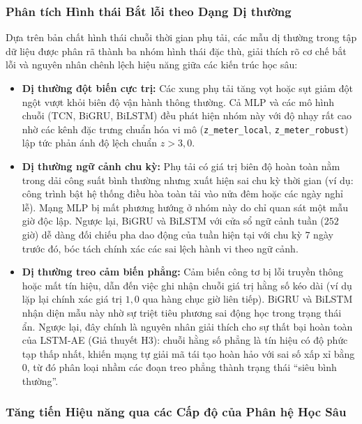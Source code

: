\subsubsection{Phân tích Hình thái Bắt lỗi theo Dạng Dị thường}

Dựa trên bản chất hình thái chuỗi thời gian phụ tải, các mẫu dị thường trong tập dữ liệu được phân rã thành ba nhóm hình thái đặc thù, giải thích rõ cơ chế bắt lỗi và nguyên nhân chênh lệch hiệu năng giữa các kiến trúc học sâu:
\begin{itemize}
    \item \textbf{Dị thường đột biến cực trị:} Các xung phụ tải tăng vọt hoặc sụt giảm đột ngột vượt khỏi biên độ vận hành thông thường. Cả MLP và các mô hình chuỗi (TCN, BiGRU, BiLSTM) đều phát hiện nhóm này với độ nhạy rất cao nhờ các kênh đặc trưng chuẩn hóa vi mô (\texttt{z\_meter\_local}, \texttt{z\_meter\_robust}) lập tức phản ánh độ lệch chuẩn $z > 3{,}0$.
    \item \textbf{Dị thường ngữ cảnh chu kỳ:} Phụ tải có giá trị biên độ hoàn toàn nằm trong dải công suất bình thường nhưng xuất hiện sai chu kỳ thời gian (ví dụ: công trình bật hệ thống điều hòa toàn tải vào nửa đêm hoặc các ngày nghỉ lễ). Mạng MLP bị mất phương hướng ở nhóm này do chỉ quan sát một mẫu giờ độc lập. Ngược lại, BiGRU và BiLSTM với cửa sổ ngữ cảnh tuần ($252$ giờ) dễ dàng đối chiếu pha dao động của tuần hiện tại với chu kỳ 7 ngày trước đó, bóc tách chính xác các sai lệch hành vi theo ngữ cảnh.
    \item \textbf{Dị thường treo cảm biến phẳng:} Cảm biến công tơ bị lỗi truyền thông hoặc mất tín hiệu, dẫn đến việc ghi nhận chuỗi giá trị hằng số kéo dài (ví dụ lặp lại chính xác giá trị $1{,}0$ qua hàng chục giờ liên tiếp). BiGRU và BiLSTM nhận diện mẫu này nhờ sự triệt tiêu phương sai động học trong trạng thái ẩn. Ngược lại, đây chính là nguyên nhân giải thích cho sự thất bại hoàn toàn của LSTM-AE (Giả thuyết H3): chuỗi hằng số phẳng là tín hiệu có độ phức tạp thấp nhất, khiến mạng tự giải mã tái tạo hoàn hảo với sai số xấp xỉ bằng $0$, từ đó phân loại nhầm các đoạn treo phẳng thành trạng thái ``siêu bình thường''.
\end{itemize}

\subsubsection{Tăng tiến Hiệu năng qua các Cấp độ của Phân hệ Học Sâu}

